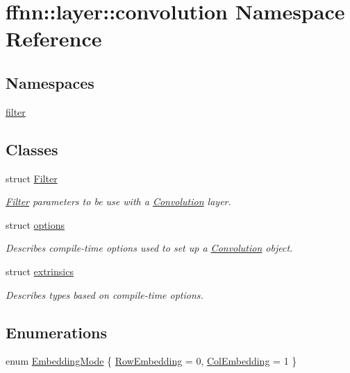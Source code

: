\hypertarget{namespaceffnn_1_1layer_1_1convolution}{\section{ffnn\-:\-:layer\-:\-:convolution Namespace Reference}
\label{namespaceffnn_1_1layer_1_1convolution}
}
\subsection*{Namespaces}
\begin{DoxyCompactItemize}
\item 
\hyperlink{namespaceffnn_1_1layer_1_1convolution_1_1filter}{filter}
\end{DoxyCompactItemize}
\subsection*{Classes}
\begin{DoxyCompactItemize}
\item 
struct \hyperlink{structffnn_1_1layer_1_1convolution_1_1_filter}{Filter}
\begin{DoxyCompactList}\small\item\em \hyperlink{structffnn_1_1layer_1_1convolution_1_1_filter}{Filter} parameters to be use with a \hyperlink{classffnn_1_1layer_1_1_convolution}{Convolution} layer. \end{DoxyCompactList}\item 
struct \hyperlink{structffnn_1_1layer_1_1convolution_1_1options}{options}
\begin{DoxyCompactList}\small\item\em Describes compile-\/time options used to set up a \hyperlink{classffnn_1_1layer_1_1_convolution}{Convolution} object. \end{DoxyCompactList}\item 
struct \hyperlink{structffnn_1_1layer_1_1convolution_1_1extrinsics}{extrinsics}
\begin{DoxyCompactList}\small\item\em Describes types based on compile-\/time options. \end{DoxyCompactList}\end{DoxyCompactItemize}
\subsection*{Enumerations}
\begin{DoxyCompactItemize}
\item 
enum \hyperlink{namespaceffnn_1_1layer_1_1convolution_ad420d4eb8edd7c254d1f0aaaad81017f}{Embedding\-Mode} \{ \hyperlink{namespaceffnn_1_1layer_1_1convolution_ad420d4eb8edd7c254d1f0aaaad81017fa1c03b5145e31615496457aa687a180c2}{Row\-Embedding} = 0, 
\hyperlink{namespaceffnn_1_1layer_1_1convolution_ad420d4eb8edd7c254d1f0aaaad81017fae2ba27e8fa1aed3f003e54947f37d17e}{Col\-Embedding} = 1
 \}
\end{DoxyCompactItemize}
